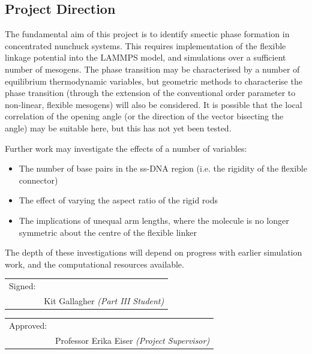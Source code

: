 \documentclass[11pt, a4paper]{article} %
\begin{document}
\subsection{Project Direction} \label{Future}
The fundamental aim of this project is to identify smectic phase formation in concentrated nunchuck systems. This requires implementation of the flexible linkage potential into the LAMMPS model, and simulations over a sufficient number of mesogens. The phase transition may be characterised by a number of equilibrium thermodynamic variables, but geometric methods to characterise the phase transition (through the extension of the conventional order parameter to non-linear, flexible mesogens) will also be considered. It is possible that the local correlation of the opening angle (or the direction of the vector bisecting the angle) may be suitable here, but this has not yet been tested.
 
Further work may investigate the effects of a number of variables:
\begin{itemize}
	\item The number of base pairs in the ss-DNA region (i.e. the rigidity of the flexible connector)
	\item The effect of varying the aspect ratio of the rigid rods
	\item The implications of unequal arm lengths, where the molecule is no longer symmetric about the centre of the flexible linker
\end{itemize}

The depth of these investigations will depend on progress with earlier simulation work, and the computational resources available.

\vspace{2cm}
\noindent \begin{tabular}{@{}p{.55in}p{4in}@{}}
	Signed: & \hrulefill \\
	& Kit Gallagher \textit{(Part III Student)} \\
\end{tabular}

\vspace{1.5cm}
\noindent \begin{tabular}{@{}p{.55in}p{4in}@{}}
	Approved: & \hrulefill \\
	& Professor Erika Eiser \textit{(Project Supervisor)} \\
\end{tabular}


\printbibliography
\end{document}
